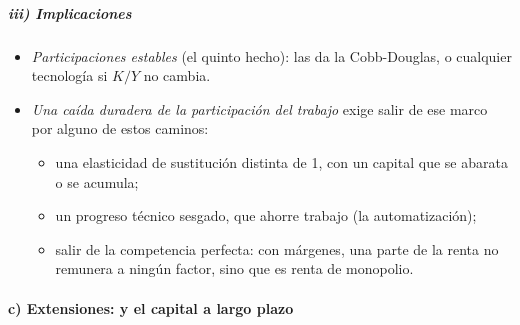 \documentclass[11pt]{article}
\begin{document}
\subparagraph{iii) Implicaciones}

\begin{itemize}
\item \emph{Participaciones estables} (el quinto hecho): las da la Cobb-Douglas, o cualquier tecnología si $K/Y$ no cambia.
\item \emph{Una caída duradera de la participación del trabajo} exige salir de ese marco por alguno de estos caminos:
  \begin{itemize}
  \item una elasticidad de sustitución distinta de 1, con un capital que se abarata o se acumula;
  \item un progreso técnico sesgado, que ahorre trabajo (la automatización);
  \item salir de la competencia perfecta: con márgenes, una parte de la renta no remunera a ningún factor, sino que es renta de monopolio.
  \end{itemize}
\end{itemize}

\paragraph{c) Extensiones:  y el capital a largo plazo}
\end{document}
